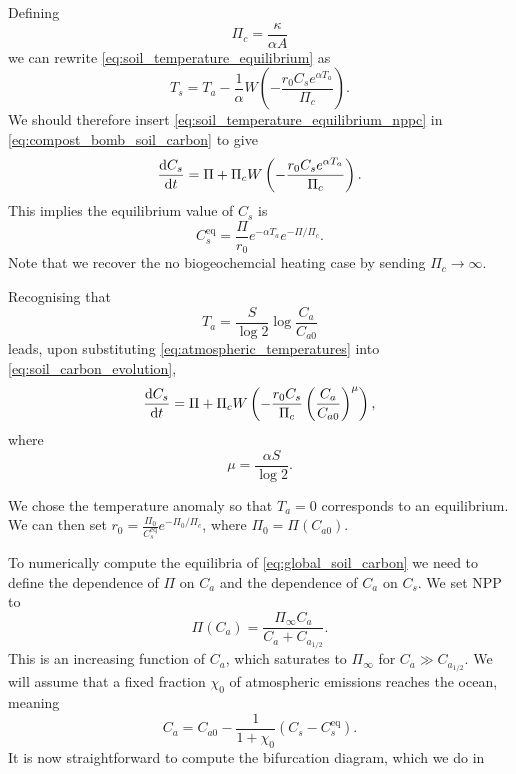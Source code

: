 Defining
\begin{equation}
  \label{eq:critical_npp}
  \Pi_c = \frac{\kappa}{\alpha A}
\end{equation}
we can rewrite \cref{eq:soil_temperature_equilibrium} as
\begin{equation}
  \label{eq:soil_temperature_equilibrium_nppc}
  T_s = T_a - \frac{1}{\alpha} W\left(-\frac{r_0C_s e^{\alpha T_a}}{\Pi_c} \right).
\end{equation}
We should therefore insert \cref{eq:soil_temperature_equilibrium_nppc} in \cref{eq:compost_bomb_soil_carbon}
to give
\begin{equation}
  \label{eq:soil_carbon_evolution}
  \dv{C_s}{t} = \Pi + \Pi_c W\left(-\frac{r_0C_s e^{\alpha T_a}}{\Pi_c} \right).
\end{equation}
This implies the equilibrium value of $C_s$ is
\begin{equation}
  \label{eq:equilibirum_soil_carbon}
  C_s^{\mathrm{eq}} = \frac{\Pi}{r_0} e^{-\alpha T_a} e^{-\Pi/\Pi_c}.
\end{equation}
Note that we recover the no biogeochemcial heating case by sending $\Pi_c \rightarrow \infty$.


Recognising that
\begin{equation}
  \label{eq:atmospheric_temperatures}
  T_a = \frac{S}{\log 2} \log \frac{C_a}{C_{a0}} 
\end{equation}
leads, upon substituting \cref{eq:atmospheric_temperatures} into \cref{eq:soil_carbon_evolution},
\begin{equation}
  \label{eq:global_soil_carbon}
  \dv{C_s}{t} = \Pi + \Pi_c W\left(-\frac{r_0C_s}{\Pi_c} \left(\frac{C_a}{C_{a0}}\right)^\mu \right),
\end{equation}
where
\begin{equation}
  \label{eq:mu}
  \mu = \frac{\alpha S}{\log 2}.
\end{equation}


We chose the temperature anomaly so that $T_a = 0$ corresponds to an equilibrium. We can then set
$r_0 = \frac{\Pi_0}{C_s^{\mathrm{eq}}}e^{-\Pi_0/\Pi_c}$, where $\Pi_0 = \Pi\left(C_{a0}\right)$.

To
numerically compute the equilibria of \cref{eq:global_soil_carbon} we need to define the dependence of $\Pi$ on
$C_a$  and the dependence of $C_a$ on $C_s$. We set NPP to
\begin{equation}
  \label{eq:npp_fertilization}
  \Pi(C_a) = \frac{\Pi_{\infty} C_a}{C_a + C_{a_{1/2}}}.
\end{equation}
This is an increasing function of $C_a$, which saturates to $\Pi_{\infty}$ for $C_a \gg C_{a_{1/2}}$.
We will assume  that a fixed fraction $\chi_0$ of atmospheric emissions reaches the ocean, meaning
\begin{equation}
  \label{eq:simple_ocean}
  C_a = C_{a0} -\frac{1}{1+\chi_0} (C_s - C_{s}^{\mathrm{eq}}).
\end{equation}
It is now straightforward to compute the bifurcation diagram, which we do in  

